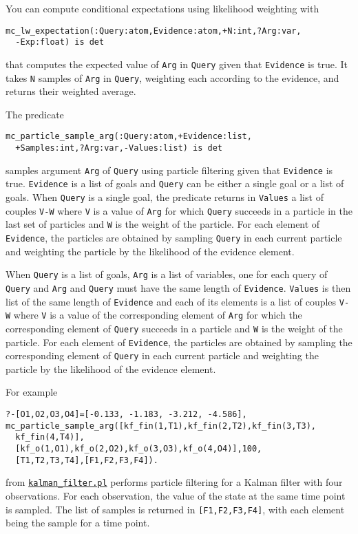 You can compute conditional expectations using likelihood weighting with
\begin{verbatim}
mc_lw_expectation(:Query:atom,Evidence:atom,+N:int,?Arg:var,
  -Exp:float) is det
\end{verbatim}
that computes the expected value of \verb|Arg| in \verb|Query| given that
\verb|Evidence| is true.
It takes \verb|N| samples of  \verb|Arg| in \verb|Query|, weighting each according
to the evidence, and returns their weighted average.



The predicate
\begin{verbatim}
mc_particle_sample_arg(:Query:atom,+Evidence:list,
  +Samples:int,?Arg:var,-Values:list) is det
\end{verbatim}
samples argument \verb|Arg| of \verb|Query| using particle filtering
given that
\verb|Evidence|
is true. \verb|Evidence| is a list of goals and \verb|Query| can be either
a single goal or a list of goals.
When \verb|Query| is a single goal, the predicate returns in \verb|Values| a list of couples \verb|V-W| where
\verb|V| is a value of \verb|Arg| for which \verb|Query| succeeds in
a particle in the last set of particles and \verb|W| is the weight of the particle.
For each element of \verb|Evidence|, the particles are obtained by sampling \verb|Query|
in each current particle and weighting the particle by the likelihood of the evidence element.

When \verb|Query| is a list of goals,  \verb|Arg| is a list of variables, one for
each query of \verb|Query| and \verb|Arg| and \verb|Query| must have the same length of \verb|Evidence|.
\verb|Values| is then list of the same length of \verb|Evidence| and each of its
elements is a list of couples \verb|V-W| where
\verb|V| is a value of the corresponding element of \verb|Arg| for which the corresponding element of
\verb|Query| succeeds in
a particle and \verb|W| is the weight of the particle.
For each element of \verb|Evidence|, the particles are obtained by sampling the corresponding element of \verb|Query|
in each current particle and weighting the particle by the likelihood of the evidence element.


For example
\begin{verbatim}
?-[O1,O2,O3,O4]=[-0.133, -1.183, -3.212, -4.586],
mc_particle_sample_arg([kf_fin(1,T1),kf_fin(2,T2),kf_fin(3,T3),
  kf_fin(4,T4)],
  [kf_o(1,O1),kf_o(2,O2),kf_o(3,O3),kf_o(4,O4)],100,
  [T1,T2,T3,T4],[F1,F2,F3,F4]).
\end{verbatim}
from \href{http://cplint.eu/e/kalman_filter.pl}{\texttt{kalman\_filter.pl}} performs
particle filtering for a Kalman filter with four observations. For each observation, the value of the state
at the same time point is sampled. The list of samples is returned in \verb|[F1,F2,F3,F4]|, with each element
being the sample for a time point.

